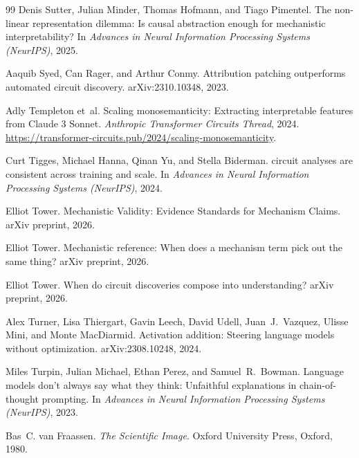 \documentclass{article}
\begin{document}
\begin{thebibliography}{99}
Denis Sutter, Julian Minder, Thomas Hofmann, and Tiago Pimentel.
\newblock The non-linear representation dilemma: Is causal abstraction enough
  for mechanistic interpretability?
\newblock In \emph{Advances in Neural Information Processing Systems
  (NeurIPS)}, 2025.

Aaquib Syed, Can Rager, and Arthur Conmy.
\newblock Attribution patching outperforms automated circuit discovery.
\newblock arXiv:2310.10348, 2023.

Adly Templeton et~al.
\newblock Scaling monosemanticity: Extracting interpretable features from
  {Claude 3 Sonnet}.
\newblock \emph{Anthropic Transformer Circuits Thread}, 2024.
\newblock \url{https://transformer-circuits.pub/2024/scaling-monosemanticity}.

Curt Tigges, Michael Hanna, Qinan Yu, and Stella Biderman.
 circuit analyses are consistent across training and scale.
\newblock In \emph{Advances in Neural Information Processing Systems (NeurIPS)}, 2024.

Elliot Tower.
\newblock Mechanistic Validity: Evidence Standards for Mechanism Claims.
\newblock arXiv preprint, 2026.

Elliot Tower.
\newblock Mechanistic reference: When does a mechanism term pick out the same
  thing?
\newblock arXiv preprint, 2026.

Elliot Tower.
\newblock When do circuit discoveries compose into understanding?
\newblock arXiv preprint, 2026.

Alex Turner, Lisa Thiergart, Gavin Leech, David Udell, Juan~J.\ Vazquez,
  Ulisse Mini, and Monte MacDiarmid.
\newblock Activation addition: Steering language models without optimization.
\newblock arXiv:2308.10248, 2024.

Miles Turpin, Julian Michael, Ethan Perez, and Samuel~R.\ Bowman.
\newblock Language models don't always say what they think: Unfaithful
  explanations in chain-of-thought prompting.
\newblock In \emph{Advances in Neural Information Processing Systems (NeurIPS)}, 2023.

Bas~C. van Fraassen.
\newblock \emph{The Scientific Image}.
\newblock Oxford University Press, Oxford, 1980.


\end{thebibliography}
\end{document}
